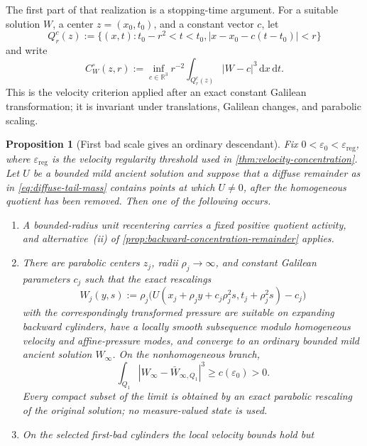 \documentclass[11pt]{amsart}
\numberwithin{equation}{section}
\theoremstyle{plain}
\newtheorem{proposition}[proposition]{Proposition}
\theoremstyle{definition}
\theoremstyle{remark}
\newcommand{\R}{\mathbb R}
\newcommand{\dd}{\,\mathrm d}
\begin{document}
The first part of that realization is a stopping-time argument.  For a
suitable solution \(W\), a center \(z=(x_0,t_0)\), and a constant vector
\(c\), let
\[
 Q_r^c(z):=\{(x,t):t_0-r^2<t<t_0,
             |x-x_0-c(t-t_0)|<r\}
\]
and write
\begin{equation}\label{eq:galilean-reduced-C}
 C_W^\circ(z,r)
 :=\inf_{c\in\R^3}r^{-2}\int_{Q_r^c(z)}|W-c|^3\dd x\dd t.
\end{equation}
This is the velocity criterion applied after an exact constant Galilean
transformation; it is invariant under translations, Galilean changes, and
parabolic scaling.

\begin{proposition}[First bad scale gives an ordinary descendant]
\label{prop:first-bad-scale-descendant}
Fix \(0<\varepsilon_0<\varepsilon_{\mathrm{reg}}\), where
\(\varepsilon_{\mathrm{reg}}\) is the velocity regularity threshold used in
\cref{thm:velocity-concentration}.  Let \(U\) be a bounded mild ancient
solution and suppose that a diffuse remainder as in
\eqref{eq:diffuse-tail-mass} contains points at which \(U\ne0\), after the
homogeneous quotient has been removed.  Then one of the following occurs.
\begin{enumerate}[label=\textup{(\alph*)},leftmargin=2.2em]
\item A bounded-radius unit recentering carries a fixed positive quotient
activity, and alternative~\textup{(ii)} of
\cref{prop:backward-concentration-remainder} applies.
\item There are parabolic centers \(z_j\), radii \(\rho_j\to\infty\), and
constant Galilean parameters \(c_j\) such that the exact rescalings
\begin{equation}\label{eq:first-bad-rescaling}
 W_j(y,s):=\rho_j
   \bigl(U(x_j+\rho_jy+c_j\rho_j^2s,
                 t_j+\rho_j^2s)-c_j\bigr)
\end{equation}
with the correspondingly transformed pressure are suitable on expanding
backward cylinders, have a locally smooth subsequence modulo homogeneous
velocity and affine-pressure modes, and converge to an ordinary bounded mild
ancient solution \(W_\infty\).  On the nonhomogeneous branch,
\begin{equation}\label{eq:first-bad-descendant-floor}
 \int_{Q_1}|W_\infty-\bar W_{\infty,Q_1}|^3\ge c(\varepsilon_0)>0.
\end{equation}
Every compact subset of the limit is obtained by an exact parabolic
rescaling of the original solution; no measure-valued state is used.
\item On the selected first-bad cylinders the local velocity bounds hold but

\end{enumerate}
\end{proposition}
\end{document}
